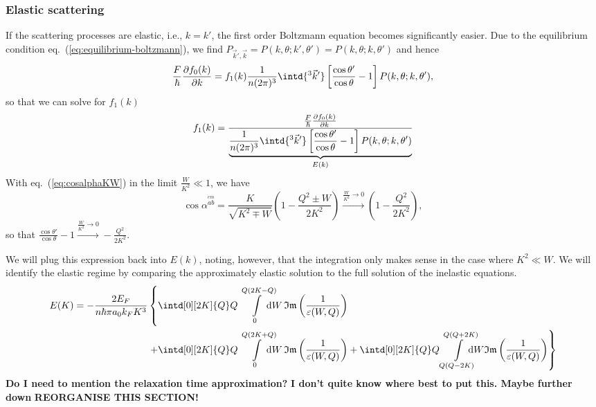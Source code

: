 \documentclass[physics,phd,nolot,nolof]{uccthesis}%
\newcommand{\alert}[1]{\textbf{\color{red}#1}}
\begin{document}
{\subsubsection{Elastic scattering}
If the scattering processes are elastic, i.e., $k = k'$, the first order Boltzmann 
equation becomes significantly easier.
Due to the equilibrium condition eq.~(\ref{eq:equilibrium-boltzmann}), we find 
$P_{\vec k',\vec k} = P(k,\theta; k',\theta') = P(k,\theta; k,\theta')$ and hence
\begin{equation}
	\frac{F}{\hbar} 
	\frac{\partial f_0(k)}{\partial k}
  =  f_1(k)
  \frac{1}{n(2\pi)^3} \intd{^3\vec k'}  
	 \left[ \frac{\cos\theta'}{\cos\theta}-1\right]
  		  P(k,\theta; k,\theta'),
  \label{eq:Boltzmann-1-elastic}
\end{equation}
so that we can solve for $f_1(k)$
\begin{equation}
f_1(k)=\frac{
	\frac{F}{\hbar} \frac{\partial f_0(k)}{\partial k}
  	}{
	\underbrace{
	\frac{1}{n(2\pi)^3} \intd{^3\vec k'}
	 \left[ \frac{\cos\theta'}{\cos\theta}-1\right]
		  P(k,\theta; k,\theta')
		  }_{E(k)}
	 }
  \label{eq:Boltzmann-1-elastic}
\end{equation}
With eq.~(\ref{eq:cosalphaKW}) in the limit $\frac{W}{K^2}\ll 1$, 
we have 
\begin{equation}
  \cos\alpha^{\stackrel{em}{ab}}
    =\frac{K}{\sqrt{K^2\mp W}}\left(1-\frac{Q^2\pm W}{2K^2}\right)
    \stackrel{\frac{W}{K^2}\to0}{\longrightarrow} \left(1-\frac{Q^2}{2K^2}\right),
  \label{eq:cosalphaKW-elastic}
\end{equation}
so that $\frac{\cos\theta'}{\cos\theta}-1 \stackrel{\frac{W}{K^2}\to0}{\longrightarrow}-\frac{Q^2}{2K^2}$.

We will plug this expression back into $E(k)$, noting, however, that the integration only makes sense in the case where $K^2\ll W$.  
We will identify the elastic regime by comparing the approximately elastic 
solution to the full solution of the inelastic equations.
\begin{equation}
  \begin{split}
    E(K) =
  - \frac{2E_F}{n\hbar \pi a_0k_F K^3} 
 & \left\{
\intd[0][2K]{Q}Q
  \int\limits_{0}^{Q\left(2K-Q\right)}\!\!\!\!\!\!\mathrm{d}W\,
\mathfrak{Im}\left(\frac{1}{\varepsilon(W,Q)}\right) 
\right.\\
&\left. + \intd[0][2K]{Q}Q
  \int\limits_{0}^{Q\left(2K+Q\right)}\!\!\!\!\!\!\mathrm{d}W\,
\mathfrak{Im}\left(\frac{1}{\varepsilon(W,Q)}\right) 
+ \intd[0][2K]{Q}Q
  \int\limits_{Q\left(Q-2K\right)}^{Q\left(Q+2K\right)}\!\!\!\!\!\!\mathrm{d}W
\mathfrak{Im}\left(\frac{1}{\varepsilon(W,Q)}\right) 
\right\}
  \label{eq:EK}
\end{split}
\end{equation}
\alert{Do I need to mention the relaxation time approximation?}
\alert{I don't quite know where best to put this. Maybe further down}
\alert{REORGANISE THIS SECTION!}
}
\end{document}
